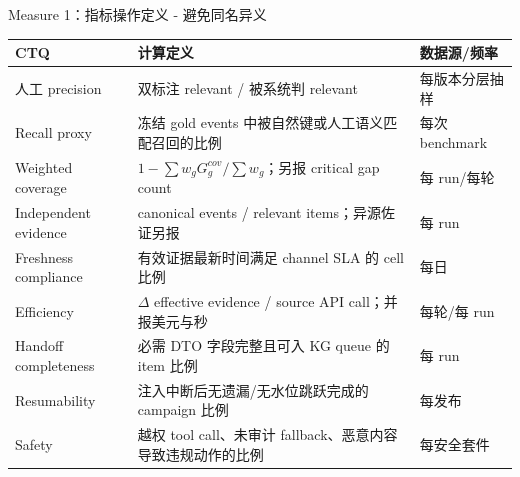 \begin{frame}{Measure 1：指标操作定义 - 避免同名异义}
\scriptsize
\begin{tabularx}{\textwidth}{p{} X p{}}
\toprule
CTQ & 计算定义 & 数据源/频率 \\
\midrule
人工 precision & 双标注 relevant / 被系统判 relevant & 每版本分层抽样 \\
Recall proxy & 冻结 gold events 中被自然键或人工语义匹配召回的比例 & 每次 benchmark \\
Weighted coverage & $1-\sum w_gG^{cov}_g/\sum w_g$；另报 critical gap count & 每 run/每轮 \\
Independent evidence & canonical events / relevant items；异源佐证另报 & 每 run \\
Freshness compliance & 有效证据最新时间满足 channel SLA 的 cell 比例 & 每日 \\
Efficiency & $\Delta$ effective evidence / source API call；并报美元与秒 & 每轮/每 run \\
Handoff completeness & 必需 DTO 字段完整且可入 KG queue 的 item 比例 & 每 run \\
Resumability & 注入中断后无遗漏/无水位跳跃完成的 campaign 比例 & 每发布 \\
Safety & 越权 tool call、未审计 fallback、恶意内容导致违规动作的比例 & 每安全套件 \\
\bottomrule
\end{tabularx}
\end{frame}

